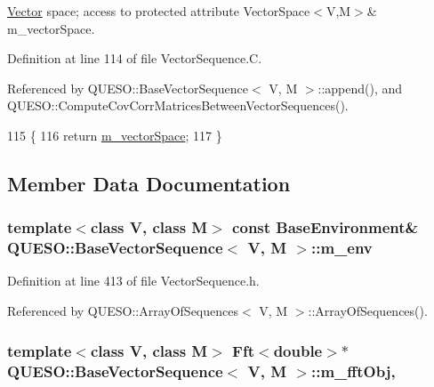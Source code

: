 \hyperlink{class_q_u_e_s_o_1_1_vector}{Vector} space; access to protected attribute Vector\-Space$<$\-V,\-M$>$\& m\-\_\-vector\-Space. 



Definition at line 114 of file Vector\-Sequence.\-C.



Referenced by Q\-U\-E\-S\-O\-::\-Base\-Vector\-Sequence$<$ V, M $>$\-::append(), and Q\-U\-E\-S\-O\-::\-Compute\-Cov\-Corr\-Matrices\-Between\-Vector\-Sequences().


\begin{DoxyCode}
115 \{
116   \textcolor{keywordflow}{return} \hyperlink{class_q_u_e_s_o_1_1_base_vector_sequence_a4bd171e39ed050ff105c808336f35198}{m\_vectorSpace};
117 \}
\end{DoxyCode}


\subsection{Member Data Documentation}
\hypertarget{class_q_u_e_s_o_1_1_base_vector_sequence_a8e8824d2a63c5a43bcc6473e3a0491e8}{
\subsubsection[{m\-\_\-env}]{\setlength{\rightskip}{0pt plus 5cm}template$<$class V, class M$>$ const {\bf Base\-Environment}\& {\bf Q\-U\-E\-S\-O\-::\-Base\-Vector\-Sequence}$<$ V, M $>$\-::m\-\_\-env\hspace{0.3cm}{\ttfamily [protected]}}}\label{class_q_u_e_s_o_1_1_base_vector_sequence_a8e8824d2a63c5a43bcc6473e3a0491e8}


Definition at line 413 of file Vector\-Sequence.\-h.



Referenced by Q\-U\-E\-S\-O\-::\-Array\-Of\-Sequences$<$ V, M $>$\-::\-Array\-Of\-Sequences().

\hypertarget{class_q_u_e_s_o_1_1_base_vector_sequence_add593820ac53e4adccb3002ba0becfa7}{
\subsubsection[{m\-\_\-fft\-Obj}]{\setlength{\rightskip}{0pt plus 5cm}template$<$class V, class M$>$ {\bf Fft}$<$double$>$$\ast$ {\bf Q\-U\-E\-S\-O\-::\-Base\-Vector\-Sequence}$<$ V, M $>$\-::m\-\_\-fft\-Obj\hspace{0.3cm}{\ttfamily [mutable]}, {\ttfamily [protected]}}}\label{class_q_u_e_s_o_1_1_base_vector_sequence_add593820ac53e4adccb3002ba0becfa7}


